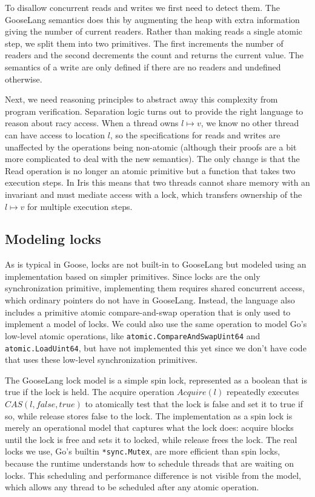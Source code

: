 To disallow concurrent reads and writes we first need to detect them.
The GooseLang semantics does this by augmenting the heap with extra
information giving the number of current readers. Rather than making
reads a single atomic step, we split them into two primitives. The first
increments the number of readers and the second decrements the count and
returns the current value. The semantics of a write are only defined if
there are no readers and undefined otherwise.

Next, we need reasoning principles to abstract away this complexity from
program verification. Separation logic turns out to provide the right
language to reason about racy access. When a thread owns
\(l \mapsto v\), we know no other thread can have access to location
\(l\), so the specifications for reads and writes are unaffected by the
operations being non-atomic (although their proofs are a bit more
complicated to deal with the new semantics). The only change is that the
Read operation is no longer an atomic primitive but a function that
takes two execution steps. In Iris this means that two threads cannot
share memory with an invariant and must mediate access with a lock,
which transfers ownership of the \(l \mapsto v\) for multiple execution
steps.

\hypertarget{modeling-locks}{%
\subsection{Modeling locks}\label{modeling-locks}}

As is typical in Goose, locks are not built-in to GooseLang but modeled
using an implementation based on simpler primitives. Since locks are the
only synchronization primitive, implementing them requires shared
concurrent access, which ordinary pointers do not have in GooseLang.
Instead, the language also includes a primitive atomic compare-and-swap
operation that is only used to implement a model of locks. We could also
use the same operation to model Go's low-level atomic operations, like
\texttt{atomic.CompareAndSwapUint64} and \texttt{atomic.LoadUint64}, but
have not implemented this yet since we don't have code that uses these
low-level synchronization primitives.

The GooseLang lock model is a simple spin lock, represented as a boolean
that is true if the lock is held. The acquire operation \(Acquire(l)\)
repeatedly executes \(CAS(l, false, true)\) to atomically test that the
lock is false and set it to true if so, while release stores false to
the lock. The implementation as a spin lock is merely an operational
model that captures what the lock does: acquire blocks until the lock is
free and sets it to locked, while release frees the lock. The real locks
we use, Go's builtin \texttt{*sync.Mutex}, are more efficient than spin
locks, because the runtime understands how to schedule threads that are
waiting on locks. This scheduling and performance difference is not
visible from the model, which allows any thread to be scheduled after
any atomic operation.

